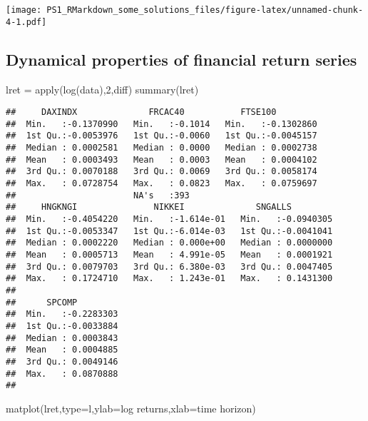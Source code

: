 \documentclass[
]{article}
\newenvironment{Shaded}{\begin{snugshade}}{\end{snugshade}}
\newcommand{\AttributeTok}[1]{\textcolor[rgb]{0.77,0.63,0.00}{#1}}
\newcommand{\DecValTok}[1]{\textcolor[rgb]{0.00,0.00,0.81}{#1}}
\newcommand{\FunctionTok}[1]{\textcolor[rgb]{0.00,0.00,0.00}{#1}}
\newcommand{\NormalTok}[1]{#1}
\newcommand{\OtherTok}[1]{\textcolor[rgb]{0.56,0.35,0.01}{#1}}
\newcommand{\StringTok}[1]{\textcolor[rgb]{0.31,0.60,0.02}{#1}}
\begin{document}
\texttt{[image: PS1\_RMarkdown\_some\_solutions\_files/figure-latex/unnamed-chunk-4-1.pdf]}

\hypertarget{dynamical-properties-of-financial-return-series}{%
\subsection{Dynamical properties of financial return
series}\label{dynamical-properties-of-financial-return-series}}

\begin{Shaded}
\begin{Highlighting}[]
\NormalTok{lret }\OtherTok{=} \FunctionTok{apply}\NormalTok{(}\FunctionTok{log}\NormalTok{(data),}\DecValTok{2}\NormalTok{,diff)}
\FunctionTok{summary}\NormalTok{(lret)}
\end{Highlighting}
\end{Shaded}

\begin{verbatim}
##     DAXINDX              FRCAC40           FTSE100          
##  Min.   :-0.1370990   Min.   :-0.1014   Min.   :-0.1302860  
##  1st Qu.:-0.0053976   1st Qu.:-0.0060   1st Qu.:-0.0045157  
##  Median : 0.0002581   Median : 0.0000   Median : 0.0002738  
##  Mean   : 0.0003493   Mean   : 0.0003   Mean   : 0.0004102  
##  3rd Qu.: 0.0070188   3rd Qu.: 0.0069   3rd Qu.: 0.0058174  
##  Max.   : 0.0728754   Max.   : 0.0823   Max.   : 0.0759697  
##                       NA's   :393                           
##     HNGKNGI               NIKKEI              SNGALLS          
##  Min.   :-0.4054220   Min.   :-1.614e-01   Min.   :-0.0940305  
##  1st Qu.:-0.0053347   1st Qu.:-6.014e-03   1st Qu.:-0.0041041  
##  Median : 0.0002220   Median : 0.000e+00   Median : 0.0000000  
##  Mean   : 0.0005713   Mean   : 4.991e-05   Mean   : 0.0001921  
##  3rd Qu.: 0.0079703   3rd Qu.: 6.380e-03   3rd Qu.: 0.0047405  
##  Max.   : 0.1724710   Max.   : 1.243e-01   Max.   : 0.1431300  
##                                                                
##      SPCOMP          
##  Min.   :-0.2283303  
##  1st Qu.:-0.0033884  
##  Median : 0.0003843  
##  Mean   : 0.0004885  
##  3rd Qu.: 0.0049146  
##  Max.   : 0.0870888  
## 
\end{verbatim}

\begin{Shaded}
\begin{Highlighting}[]
\FunctionTok{matplot}\NormalTok{(lret,}\AttributeTok{type=}\StringTok{\textquotesingle{}l\textquotesingle{}}\NormalTok{,}\AttributeTok{ylab=}\StringTok{\textquotesingle{}log returns\textquotesingle{}}\NormalTok{,}\AttributeTok{xlab=}\StringTok{\textquotesingle{}time horizon\textquotesingle{}}\NormalTok{)}
\end{Highlighting}
\end{Shaded}
\end{document}

